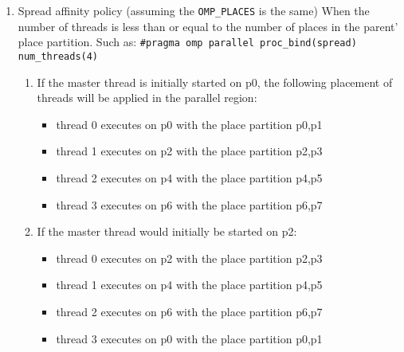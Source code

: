\documentclass[11pt]{article}
\begin{document}
\begin{enumerate}
\item Spread affinity policy
\label{sec-9-6-2-1}
(assuming the \texttt{OMP\_PLACES} is the same)
When the number of threads is less than or equal to the number of places in the parent' place partition. Such as:
\texttt{\#pragma omp parallel proc\_bind(spread) num\_threads(4)}
\begin{enumerate}
\item If the master thread is initially started on p0, the following placement of threads will be applied in the parallel region:
\begin{itemize}
\item thread 0 executes on p0 with the place partition p0,p1
\item thread 1 executes on p2 with the place partition p2,p3
\item thread 2 executes on p4 with the place partition p4,p5
\item thread 3 executes on p6 with the place partition p6,p7
\end{itemize}
\item If the master thread would initially be started on p2:
\begin{itemize}
\item thread 0 executes on p2 with the place partition p2,p3
\item thread 1 executes on p4 with the place partition p4,p5
\item thread 2 executes on p6 with the place partition p6,p7
\item thread 3 executes on p0 with the place partition p0,p1
\end{itemize}
\end{enumerate}


\end{enumerate}
\end{document}
